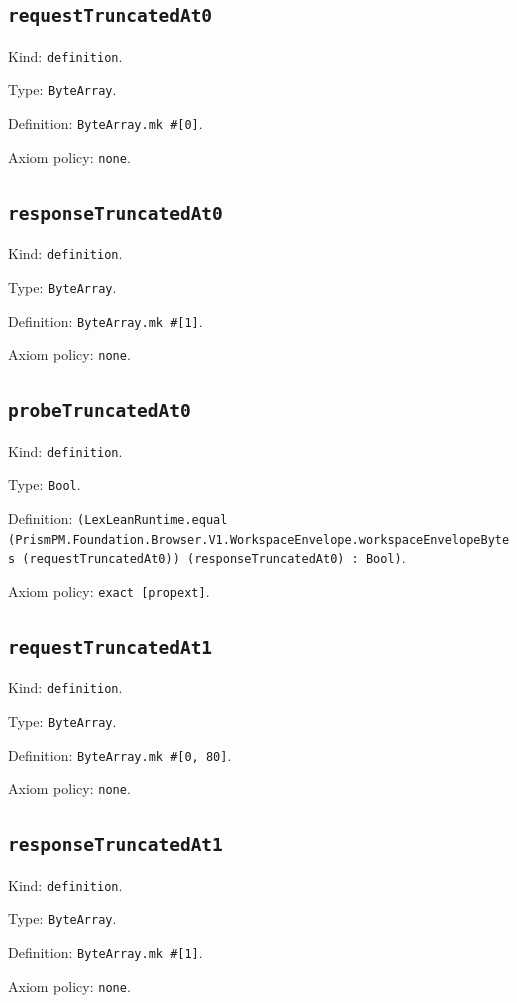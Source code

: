 \documentclass[11pt]{article}
\begin{document}
\subsection*{\texttt{requestTruncatedAt0}}
\noindent Kind: \texttt{definition}.\par
\noindent Type: \texttt{ByteArray}.\par
\noindent Definition: \texttt{ByteArray.mk \#[0]}.\par
\noindent Axiom policy: \texttt{none}.\par
\subsection*{\texttt{responseTruncatedAt0}}
\noindent Kind: \texttt{definition}.\par
\noindent Type: \texttt{ByteArray}.\par
\noindent Definition: \texttt{ByteArray.mk \#[1]}.\par
\noindent Axiom policy: \texttt{none}.\par
\subsection*{\texttt{probeTruncatedAt0}}
\noindent Kind: \texttt{definition}.\par
\noindent Type: \texttt{Bool}.\par
\noindent Definition: \texttt{(LexLeanRuntime.equal (PrismPM.Foundation.Browser.V1.WorkspaceEnvelope.workspaceEnvelopeBytes (requestTruncatedAt0)) (responseTruncatedAt0) : Bool)}.\par
\noindent Axiom policy: \texttt{exact [propext]}.\par
\subsection*{\texttt{requestTruncatedAt1}}
\noindent Kind: \texttt{definition}.\par
\noindent Type: \texttt{ByteArray}.\par
\noindent Definition: \texttt{ByteArray.mk \#[0, 80]}.\par
\noindent Axiom policy: \texttt{none}.\par
\subsection*{\texttt{responseTruncatedAt1}}
\noindent Kind: \texttt{definition}.\par
\noindent Type: \texttt{ByteArray}.\par
\noindent Definition: \texttt{ByteArray.mk \#[1]}.\par
\noindent Axiom policy: \texttt{none}.\par
\end{document}

